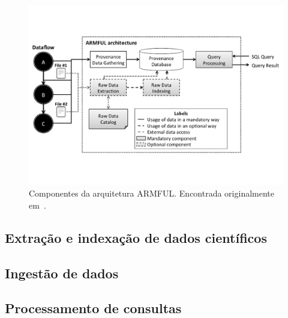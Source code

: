 \begin{figure}[ht]
    \centering
    \includegraphics[width=\textwidth]{img/armful-architecture}
    \caption[Componentes da arquitetura ARMFUL]{Componentes da arquitetura ARMFUL. Encontrada originalmente em~\cite{silva2017raw}.}%
    \label{fig:armful-architecture}
\end{figure}



\subsection{Extração e indexação de dados científicos}



\subsection{Ingestão de dados}


\subsection{Processamento de consultas}

